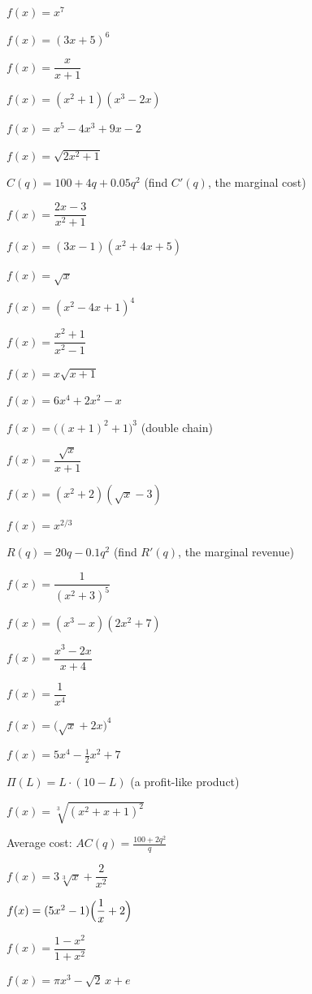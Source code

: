 \begin{problems}
  \item $f(x)=x^{7}$
  \item $f(x)=(3x+5)^{6}$
  \item $f(x)=\dfrac{x}{x+1}$
  \item $f(x)=(x^{2}+1)(x^{3}-2x)$
  \item $f(x)=x^{5}-4x^{3}+9x-2$
  \item $f(x)=\sqrt{2x^{2}+1}$
  \item $C(q)=100+4q+0.05q^{2}$ \quad (find $C'(q)$, the marginal cost)
  \item $f(x)=\dfrac{2x-3}{x^{2}+1}$
  \item $f(x)=(3x-1)(x^{2}+4x+5)$
  \item $f(x)=\sqrt{x}$
  \item $f(x)=(x^{2}-4x+1)^{4}$
  \item $f(x)=\dfrac{x^{2}+1}{x^{2}-1}$
  \item $f(x)=x\sqrt{x+1}$
  \item $f(x)=6x^{4}+2x^{2}-x$
  \item $f(x)=\bigl((x+1)^{2}+1\bigr)^{3}$ \quad (double chain)
  \item $f(x)=\dfrac{\sqrt{x}}{x+1}$
  \item $f(x)=(x^{2}+2)(\sqrt{x}-3)$
  \item $f(x)=x^{2/3}$
  \item $R(q)=20q-0.1q^{2}$ \quad (find $R'(q)$, the marginal revenue)
  \item $f(x)=\dfrac{1}{(x^{2}+3)^{5}}$
  \item $f(x)=(x^{3}-x)(2x^{2}+7)$
  \item $f(x)=\dfrac{x^{3}-2x}{x+4}$
  \item $f(x)=\dfrac{1}{x^{4}}$
  \item $f(x)=\bigl(\sqrt{x}+2x\bigr)^{4}$
  \item $f(x)=5x^{4}-\tfrac{1}{2}x^{2}+7$
  \item $\Pi(L)=L\cdot(10-L)$ \quad (a profit-like product)
  \item $f(x)=\sqrt[3]{(x^{2}+x+1)^{2}}$
  \item Average cost: $\displaystyle AC(q)=\frac{100+2q^{2}}{q}$
  \item $f(x)=3\sqrt[3]{x}+\dfrac{2}{x^{2}}$
  \item $f(x)=(5x^{2}-1)\Bigl(\dfrac{1}{x}+2\Bigr)$
  \item $f(x)=\dfrac{1-x^{2}}{1+x^{2}}$
  \item $f(x)=\pi x^{3}-\sqrt{2}\,x+e$

\end{problems}
